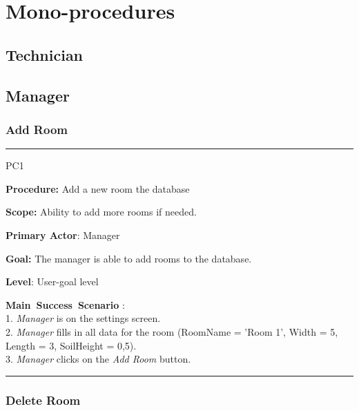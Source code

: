 \break



\section{Mono-procedures}



\subsection{Technician}







\subsection{Manager}
\subsubsection{Add Room}

\vspace{0.5cm}
\hrule
\hfill \break
\begin{lyxlist}{PC1}
\small{
\item [\textbf{Procedure:}] Add a new room the database
\item [\textbf{Scope:}] Ability to add more rooms if needed.
\item [\textbf{Primary Actor}:] Manager
\item [\textbf{Goal:}] The manager is able to add rooms to the database.
\item [\textbf{Level}:] User-goal level
\item [\textbf{Main~Success~Scenario}]:\\
1. \emph{Manager} is on the settings screen. \\
2. \emph{Manager} fills in all data for the room (RoomName = 'Room 1', Width
= 5, Length = 3, SoilHeight = 0,5).\\
3. \emph{Manager} clicks on the \emph{Add Room} button.
}
\end{lyxlist}
\hrule
\vspace{0.5cm}

\subsubsection{Delete Room}

